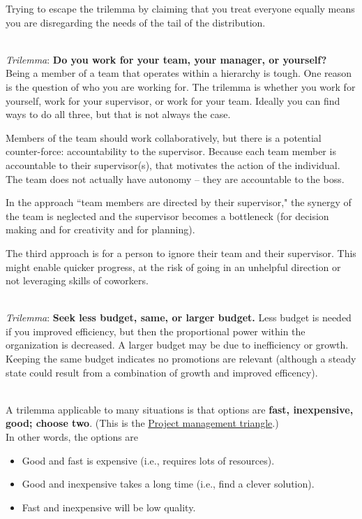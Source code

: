 Trying to escape the trilemma by claiming that you treat everyone equally means you are disregarding the needs of the tail of the distribution. 

\ \\

\textit{Trilemma}: \textbf{Do you work for your team, your manager, or yourself?} \\
Being a member of a team that operates within a hierarchy is tough. One reason is the question of who you are working for. The trilemma is whether you work for yourself, work for your supervisor, or work for your team.  Ideally you can find ways to do all three, but that is not always the case. 

Members of the team should work collaboratively, but there is a potential counter-force: accountability to the supervisor. Because each team member is accountable to their supervisor(s), that motivates the action of the individual. The team does not actually have autonomy -- they are accountable to the boss.

In the approach ``team members are directed by their supervisor," the synergy of the team is neglected and the supervisor becomes a bottleneck (for decision making and for creativity and for planning).

The third approach is for a person to ignore their team and their supervisor. This might enable quicker progress, at the risk of going in an unhelpful direction or not leveraging skills of coworkers. 

\ \\

\textit{Trilemma}:
\textbf{Seek less budget, same, or larger budget.} 
Less budget is needed if you improved efficiency, but then the proportional power within the organization is decreased. A larger budget may be due to inefficiency or growth. Keeping the same budget indicates no promotions are relevant (although a steady state could result from a combination of growth and improved efficency). 

\ \\

A trilemma applicable to many situations is that options are \textbf{fast, inexpensive, good; choose two}. 
(This is the \href{https://en.wikipedia.org/wiki/Project_management_triangle}{Project management triangle}.) 
\\
In other words, the options are
\begin{itemize}
    \item Good and fast is expensive (i.e., requires lots of resources).
    \item Good and inexpensive takes a long time (i.e., find a clever solution).
    \item Fast and inexpensive will be low quality.
\end{itemize}

